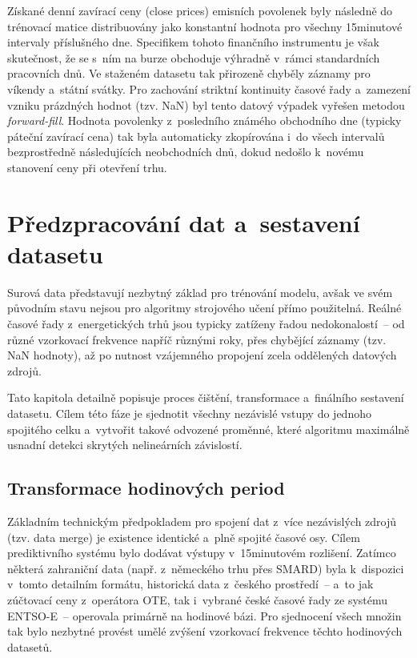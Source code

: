 \documentclass[a4paper]{article}
\begin{document}
Získané denní zavírací ceny (close prices) emisních povolenek byly následně do trénovací matice distribuovány jako konstantní hodnota pro všechny 15minutové intervaly příslušného dne. Specifikem tohoto finančního instrumentu je však skutečnost, že se s~ním na burze obchoduje výhradně v~rámci standardních pracovních dnů. Ve staženém datasetu tak přirozeně chyběly záznamy pro víkendy a~státní svátky. Pro zachování striktní kontinuity časové řady a~zamezení vzniku prázdných hodnot (tzv. NaN) byl tento datový výpadek vyřešen metodou \textit{forward-fill}. Hodnota povolenky z~posledního známého obchodního dne (typicky páteční zavírací cena) tak byla automaticky zkopírována i~do všech intervalů bezprostředně následujících neobchodních dnů, dokud nedošlo k~novému stanovení ceny při otevření trhu.

\newpage
\section{Předzpracování dat a~sestavení datasetu}
Surová data představují nezbytný základ pro trénování modelu, avšak ve svém původním stavu nejsou pro algoritmy strojového učení přímo použitelná. Reálné časové řady z~energetických trhů jsou typicky zatíženy řadou nedokonalostí~-- od různé vzorkovací frekvence napříč různými roky, přes chybějící záznamy (tzv. NaN hodnoty), až po nutnost vzájemného propojení zcela oddělených datových zdrojů.

Tato kapitola detailně popisuje proces čištění, transformace a~finálního sestavení datasetu. Cílem této fáze je sjednotit všechny nezávislé vstupy do jednoho spojitého celku a~vytvořit takové odvozené proměnné, které algoritmu maximálně usnadní detekci skrytých nelineárních závislostí.

\subsection{Transformace hodinových period}
\label{subsec:transformace-hodinovych-period}
Základním technickým předpokladem pro spojení dat z~více nezávislých zdrojů (tzv. data merge) je existence identické a~plně spojité časové osy. Cílem prediktivního systému bylo dodávat výstupy v~15minutovém rozlišení. Zatímco některá zahraniční data (např. z~německého trhu přes SMARD) byla k~dispozici v~tomto detailním formátu, historická data z~českého prostředí~-- a~to jak zúčtovací ceny z~operátora OTE, tak i~vybrané české časové řady ze systému ENTSO-E~-- operovala primárně na hodinové bázi. Pro sjednocení všech množin tak bylo nezbytné provést umělé zvýšení vzorkovací frekvence těchto hodinových datasetů.
\end{document}
